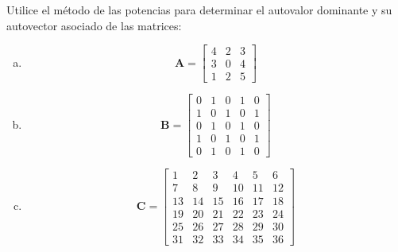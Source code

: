 \documentclass[11pt]{article}
\begin{document}
\begin{question} 
Utilice el método de las potencias para determinar el autovalor dominante y su autovector asociado de las matrices:
\begin{multicols}{3}
\begin{enumerate}[a)]
  \item 
\[ \bm{A} = \begin{bmatrix} 4 & 2 & 3 \\ 3 & 0 & 4 \\ 1 & 2 & 5 \end{bmatrix} \]
\item 
\[ \bm{B} = \begin{bmatrix} 0 & 1 & 0 & 1 & 0 \\ 1 & 0 & 1 & 0 & 1 \\ 0 & 1 & 0 & 1 & 0 \\ 1 & 0 & 1 & 0 & 1 \\ 0 & 1 & 0 & 1 & 0 \end{bmatrix} \]
\item 
    \[ \bm{C} = \begin{bmatrix}
        1 & 2 & 3 & 4 & 5 & 6 \\
        7 & 8 & 9 & 10 & 11 & 12 \\
        13 & 14 & 15 & 16 & 17 & 18 \\
        19 & 20 & 21 & 22 & 23 & 24 \\
        25 & 26 & 27 & 28 & 29 & 30 \\
        31 & 32 & 33 & 34 & 35 & 36
    \end{bmatrix} \]

\end{enumerate}
\end{multicols}
\end{question}
\end{document}
